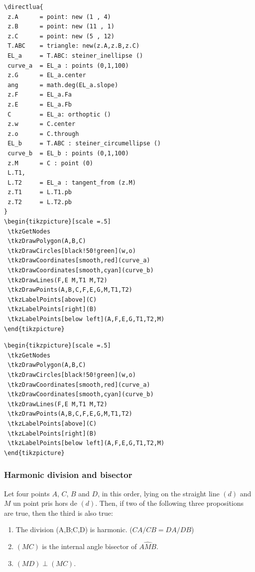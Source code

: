 \vspace{6pt}
\begin{Verbatim}
\directlua{
 z.A      = point: new (1 , 4)
 z.B      = point: new (11 , 1)
 z.C      = point: new (5 , 12) 
 T.ABC    = triangle: new(z.A,z.B,z.C)
 EL_a     = T.ABC: steiner_inellipse ()
 curve_a  = EL_a : points (0,1,100)
 z.G      = EL_a.center
 ang      = math.deg(EL_a.slope)
 z.F      = EL_a.Fa
 z.E      = EL_a.Fb
 C        = EL_a: orthoptic ()
 z.w      = C.center
 z.o      = C.through
 EL_b     = T.ABC : steiner_circumellipse ()
 curve_b  = EL_b : points (0,1,100)
 z.M      = C : point (0)
 L.T1,
 L.T2     = EL_a : tangent_from (z.M)
 z.T1     = L.T1.pb
 z.T2     = L.T2.pb
}
\begin{tikzpicture}[scale =.5]
 \tkzGetNodes
 \tkzDrawPolygon(A,B,C)
 \tkzDrawCircles[black!50!green](w,o)
 \tkzDrawCoordinates[smooth,red](curve_a)
 \tkzDrawCoordinates[smooth,cyan](curve_b)
 \tkzDrawLines(F,E M,T1 M,T2)
 \tkzDrawPoints(A,B,C,F,E,G,M,T1,T2)
 \tkzLabelPoints[above](C)
 \tkzLabelPoints[right](B)
 \tkzLabelPoints[below left](A,F,E,G,T1,T2,M)
\end{tikzpicture}

\end{Verbatim}



\begin{Verbatim}
\begin{tikzpicture}[scale =.5]
 \tkzGetNodes
 \tkzDrawPolygon(A,B,C)
 \tkzDrawCircles[black!50!green](w,o)
 \tkzDrawCoordinates[smooth,red](curve_a)
 \tkzDrawCoordinates[smooth,cyan](curve_b)
 \tkzDrawLines(F,E M,T1 M,T2)
 \tkzDrawPoints(A,B,C,F,E,G,M,T1,T2)
 \tkzLabelPoints[above](C)
 \tkzLabelPoints[right](B)
 \tkzLabelPoints[below left](A,F,E,G,T1,T2,M)
\end{tikzpicture}
\end{Verbatim}


\subsubsection{Harmonic division and bisector} %
\label{ssub:harmonic_division_and_bisector}

Let four points $A$, $C$, $B$ and $D$, in this order, lying on the straight line $(d)$ and $M$ un point pris hors de $(d)$. Then, if two of the following three propositions are true, then the third is also true:
   \begin{enumerate}
   \item  The division (A,B;C,D) is harmonic. ($CA/CB = DA/DB$)
   \item  $(MC)$ is the internal angle bisector of $\widehat{AMB}$.
   \item  $(MD) \perp (MC)$.
   \end{enumerate}
  

